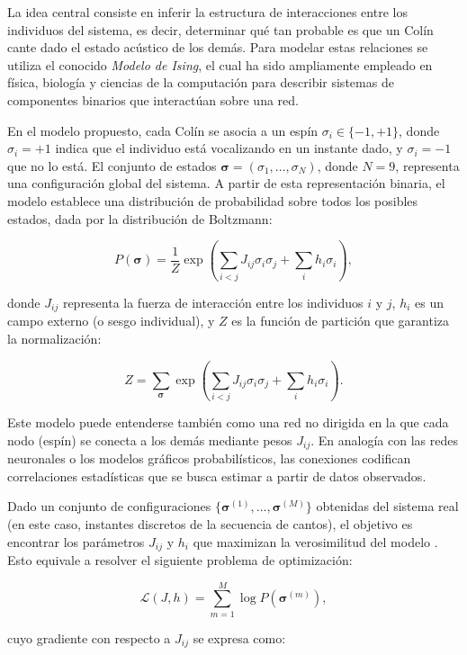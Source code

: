 \documentclass[a4paper,10pt,twocolumn]{article}
\begin{document}
La idea central consiste en inferir la estructura de 
interacciones entre los individuos del sistema, es decir, 
determinar qué tan probable es que un Colín cante dado el 
estado acústico de los demás. Para modelar estas relaciones 
se utiliza el conocido \textit{Modelo de Ising}, el cual ha 
sido ampliamente empleado en física, biología y ciencias de 
la computación para describir sistemas de componentes binarios 
que interactúan sobre una red.

En el modelo propuesto, cada Colín se asocia a un 
espín \( \sigma_i \in \{-1, +1\} \), donde 
\( \sigma_i = +1 \) indica que el individuo está vocalizando en 
un instante dado, y \( \sigma_i = -1 \) que no lo está. 
El conjunto de estados 
\( \boldsymbol{\sigma} = (\sigma_1, \dots, \sigma_N) \), 
donde \( N = 9 \), representa una configuración global del 
sistema. A partir de esta representación binaria, el modelo 
establece una distribución de probabilidad sobre todos los 
posibles estados, dada por la distribución de Boltzmann:

\[
P(\boldsymbol{\sigma}) = \frac{1}{Z} \exp\left( \sum_{i<j} J_{ij} \sigma_i \sigma_j + \sum_{i} h_i \sigma_i \right),
\]

donde \( J_{ij} \) representa la fuerza de interacción entre 
los individuos \( i \) y \( j \), \( h_i \) es un campo 
externo (o sesgo individual), y \( Z \) es la función de 
partición que garantiza la normalización:

\[
Z = \sum_{\boldsymbol{\sigma}} \exp\left( \sum_{i<j} J_{ij} \sigma_i \sigma_j + \sum_i h_i \sigma_i \right).
\]

Este modelo puede entenderse también como una red no dirigida 
en la que cada nodo (espín) se conecta a los demás mediante 
pesos \( J_{ij} \). En analogía con las redes neuronales o los 
modelos gráficos probabilísticos, las conexiones codifican 
correlaciones estadísticas que se busca estimar a partir de 
datos observados.

Dado un conjunto de configuraciones 
\(\{\boldsymbol{\sigma}^{(1)}, \dots, \boldsymbol{\sigma}^{(M)}\}\) 
obtenidas del sistema real (en este caso, instantes discretos 
de la secuencia de cantos), el objetivo es encontrar los 
parámetros \( J_{ij} \) y \( h_i \) que maximizan la 
verosimilitud del modelo \cite{zeng2013maximum}. Esto equivale a resolver el 
siguiente problema de optimización:

\[
\mathcal{L}(J, h) = \sum_{m=1}^{M} \log P(\boldsymbol{\sigma}^{(m)}),
\]

cuyo gradiente con respecto a \( J_{ij} \) se expresa como:
\end{document}

